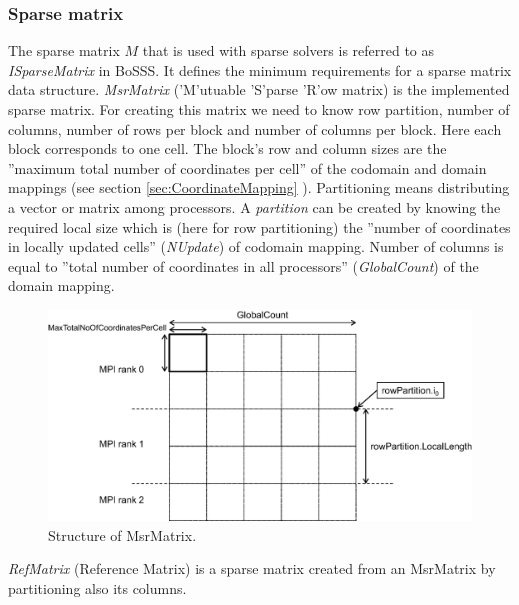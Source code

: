 \documentclass[BoSSSForSolvingConservationLaws.tex]{subfiles}
\begin{document}
\subsubsection*{Sparse matrix}
\label{sec:MsrMatrix}
The sparse matrix $M$ that is used with sparse solvers is referred to as \emph{ISparseMatrix} in BoSSS. It defines the minimum requirements for a sparse matrix data structure. \emph{MsrMatrix} ('M'utuable 'S'parse 'R'ow matrix) is the implemented sparse matrix. For creating this matrix we need to know row partition, number of columns, number of rows per block and number of columns per block. Here each block corresponds to one cell. The block's row and column sizes are the ''maximum total number of coordinates per cell'' of the codomain and domain mappings (see section \ref{sec:CoordinateMapping} ). Partitioning means distributing a vector or matrix among processors. A \emph{partition} can be created by knowing the required local size which is (here for row partitioning) the ''number of coordinates in locally updated cells'' (\emph{NUpdate}) of codomain mapping. Number of columns is equal to ''total number of coordinates in all processors'' (\emph{GlobalCount}) of the domain mapping.\\
\begin{figure}[h]
\begin{center}
\includegraphics[width=12cm]{Figures/MsrMatrix}
\end{center}
\caption{Structure of MsrMatrix.}
\end{figure}
\emph{RefMatrix} (Reference Matrix) is a sparse matrix created from an MsrMatrix by partitioning also its columns.
\end{document}
